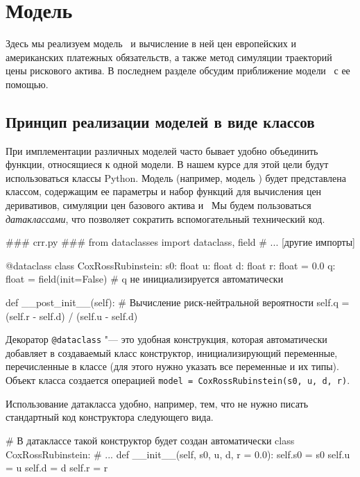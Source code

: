 \chapter{Модель \crr}
\label{ch:pr-crr}
\chaptertoc

Здесь мы реализуем модель \crr\ и вычисление в ней цен европейских и американских платежных обязательств, а также метод симуляции траекторий цены рискового актива.
В последнем разделе обсудим приближение модели \bs\ с ее помощью.

\section{Принцип реализации моделей в виде классов}
При имплементации различных моделей часто бывает удобно объединить функции, относящиеся к одной модели.
В нашем курсе для этой цели будут использоваться классы Python. 
Модель (например, модель \crr) будет представлена классом, содержащим ее параметры и набор функций для вычисления цен деривативов, симуляции цен базового актива и \td\ 
Мы будем пользоваться \emph{датаклассами}, что позволяет сократить вспомогательный технический код.
\begin{python}
### crr.py ###
from dataclasses import dataclass, field
# ... [другие импорты]

@dataclass
class CoxRossRubinstein:
    s0: float
    u: float
    d: float
    r: float = 0.0
    q: float = field(init=False)   # q не инициализируется автоматически

    def __post_init__(self):
        # Вычисление риск-нейтральной вероятности
        self.q = (self.r - self.d) / (self.u - self.d)        
\end{python}

Декоратор \verb"@dataclass" "--- это удобная конструкция, которая автоматически добавляет в создаваемый класс конструктор, инициализирующий переменные, перечисленные в классе (для этого нужно указать все переменные и их типы).
Объект класса создается операцией \verb"model = CoxRossRubinstein(s0, u, d, r)".  

Использование датакласса удобно, например, тем, что не нужно писать стандартный код конструктора следующего вида.
\begin{python}
# В датаклассе такой конструктор будет создан автоматически
class CoxRossRubinstein:
    # ...
    def __init__(self, s0, u, d, r = 0.0):
      self.s0 = s0
      self.u = u
      self.d = d
      self.r = r
\end{python}

